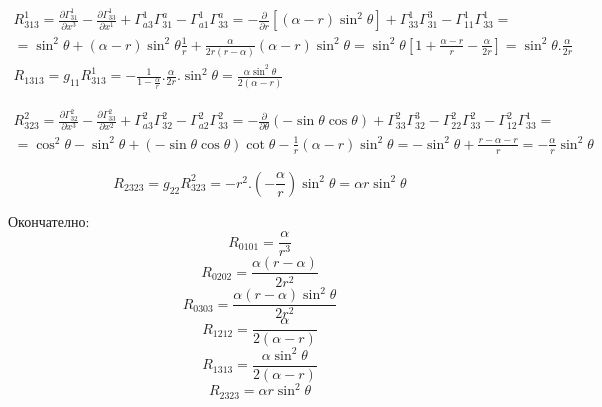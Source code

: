 \documentclass[a4paper,12pt]{article}
\begin{document}
    \newline
    \begin{equation*}
        \begin{aligned}
            R^1_{313}=\frac{\partial\varGamma^1_{31}}{\partial x^3} - \frac{\partial\varGamma^1_{33}}{\partial x^1}+\varGamma^1_{a3}\varGamma^a_{31}-\varGamma^1_{a1}\varGamma^a_{33}
            = -\frac{\partial}{\partial r} [(\alpha-r)\sin^2\theta] + \varGamma^1_{33}\varGamma^3_{31} - \varGamma^1_{11}\varGamma^1_{33} = \\
            = \sin^2\theta + (\alpha-r)\sin^2\theta\frac{1}{r} + \frac{\alpha}{2r(r-\alpha)}(\alpha-r)\sin^2\theta
            = \sin^2\theta\left[ 1 + \frac{\alpha -r}{r} - \frac{\alpha}{2r} \right] = \sin^2\theta.\frac{\alpha}{2r}
            \\
            R_{1313}=g_{11}R^1_{313} = -\frac{1}{1-\frac{\alpha}{r}}.\frac{\alpha}{2r}.\sin^2\theta = \frac{\alpha\sin^2\theta}{2(\alpha-r)}
        \end{aligned}
    \end{equation*}
    \newline

    \begin{equation*}
        \begin{aligned}
            R^2_{323} = \frac{\partial\varGamma^2_{32}}{\partial x^3} - \frac{\partial\varGamma^2_{33}}{\partial x^2} + \varGamma^2_{a3}\varGamma^2_{32} - \varGamma^2_{a2}\varGamma^2_{33} = -\frac{\partial}{\partial\theta}(-\sin\theta\cos\theta) + \varGamma^2_{33}\varGamma^3_{32}-\varGamma^2_{22}\varGamma^2_{33}-\varGamma^2_{12}\varGamma^1_{33}= \\
            = \cos^2\theta-\sin^2\theta + (-\sin\theta\cos\theta)\cot\theta - \frac{1}{r}(\alpha-r)\sin^2\theta = -\sin^2\theta + \frac{r-\alpha-r}{r}=-\frac{\alpha}{r}\sin^2\theta
        \end{aligned}
    \end{equation*}

    \begin{equation*}
        R_{2323}=g_{22}R^2_{323}=-r^2.\left( -\frac{\alpha}{r} \right)\sin^2\theta=\alpha r\sin^2\theta
    \end{equation*}

    Окончателно: 
    \begin{equation*}
        R_{0101} = \frac{\alpha}{r^3} 
    \end{equation*}
    \begin{equation*}
        R_{0202} = \frac{\alpha(r-\alpha)}{2r^2} 
    \end{equation*}
    \begin{equation*}
        R_{0303} = \frac{\alpha(r-\alpha)\sin^2\theta}{2r^2} 
    \end{equation*}
    \begin{equation*}
        R_{1212} = \frac{\alpha}{2(\alpha-r)} 
    \end{equation*}
    \begin{equation*}
        R_{1313} = \frac{\alpha\sin^2\theta}{2(\alpha-r)} 
    \end{equation*}
    \begin{equation*}
        R_{2323} = \alpha r\sin^2\theta
    \end{equation*}
\end{document}
